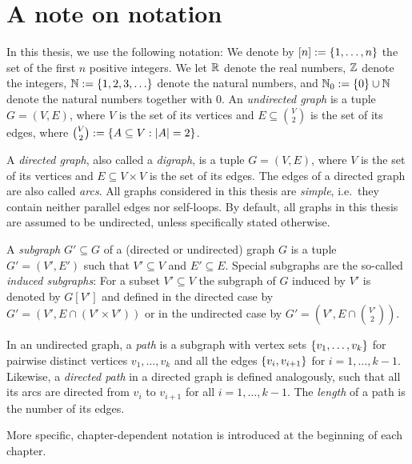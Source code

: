 \section{A note on notation}

In this thesis, we use the following notation: We denote by $[n] := \{ 1, \ldots, n \}$ the set of the first $n$ positive integers. We let $\mathbb{R}$ denote the real numbers, $\mathbb{Z}$ denote the integers, $\N := \set{1,2,3,\dots}$ denote the natural numbers, and $\mathbb{N}_0 := \{ 0 \} \cup \mathbb{N}$ denote the natural numbers together with 0. 
An \emph{undirected graph} is a tuple $G = (V,E)$, where $V$ is the set of its vertices and $E \subseteq \binom{V}{2}$ is the set of its edges, where $\binom{V}{2} := \{ A \subseteq V : |A| = 2 \}$.

A \emph{directed graph}, also called a \emph{digraph}, is a tuple $G = (V, E)$, where $V$ is the set of its vertices and $E \subseteq V \times V$ is the set of its edges. The edges of a directed graph are also called \emph{arcs}.
All graphs considered in this thesis are \emph{simple}, i.e.\ they contain neither parallel edges nor self-loops. By default, all graphs in this thesis are assumed to be undirected, unless specifically stated otherwise.


A \emph{subgraph} $G' \subseteq G$ of a (directed or undirected) graph $G$ is a tuple $G' = (V', E')$ such that $V' \subseteq V$ and $E' \subseteq E$. Special subgraphs are the so-called \emph{induced subgraphs}: For a subset $V' \subseteq V$ the subgraph of $G$ induced by $V'$ is denoted by $G[V']$ and defined in the directed case by $G' = (V', E \cap (V' \times V'))$ or in the undirected case by $G' = (V', E \cap \binom{V'}{2})$. 


In an undirected graph, a \emph{path} is a subgraph with vertex sets $\{ v_1, \ldots, v_k \}$ for pairwise distinct vertices $v_1,\dots,v_k$ and all the edges $\{ v_i,v_{i+1} \}$ for $i=1,\dots,k-1$. Likewise, a \emph{directed path} in a directed graph is defined analogously, such that all its arcs are directed from $v_i$ to $v_{i+1}$ for all $i=1,\dots,k-1$. The \emph{length} of a path is the number of its edges.  

More specific, chapter-dependent notation is introduced at the beginning of each chapter.

